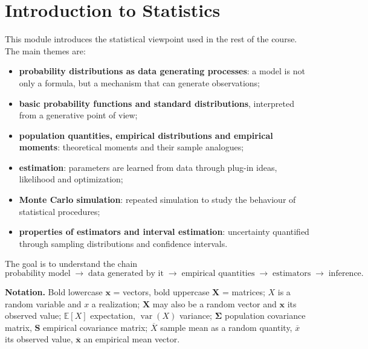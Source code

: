 
\providecommand{\PP}{\mathbb{P}}
\providecommand{\EE}{\mathbb{E}}
\providecommand{\Var}{\operatorname{var}}
\providecommand{\Cov}{\operatorname{cov}}
\providecommand{\Cor}{\operatorname{cor}}
\providecommand{\iid}{\overset{\text{i.i.d.}}{\sim}}

\chapter{Introduction to Statistics}

This module introduces the statistical viewpoint used in the rest of the course. The main themes are:
\begin{itemize}
  \item \textbf{probability distributions as data generating processes}: a model is not only a formula, but a mechanism
        that can generate observations;
  \item \textbf{basic probability functions and standard distributions}, interpreted from a generative point of view;
  \item \textbf{population quantities, empirical distributions and empirical moments}: theoretical moments and their sample analogues;
  \item \textbf{estimation}: parameters are learned from data through plug-in ideas, likelihood and optimization;
  \item \textbf{Monte Carlo simulation}: repeated simulation to study the behaviour of statistical procedures;
  \item \textbf{properties of estimators and interval estimation}: uncertainty quantified through sampling distributions and
        confidence intervals.
\end{itemize}
The goal is to understand the chain
\[
  \text{probability model} \;\to\; \text{data generated by it} \;\to\; \text{empirical quantities} \;\to\; \text{estimators}
  \;\to\; \text{inference}.
\]

\textbf{Notation.} Bold lowercase $\mathbf{x}$ = vectors, bold uppercase $\mathbf{X}$ = matrices; $X$ is a random variable and $x$ a
realization; $\mathbf{X}$ may also be a random vector and $\mathbf{x}$ its observed value; $\EE[X]$ expectation, $\Var(X)$ variance;
$\boldsymbol{\Sigma}$ population covariance matrix, $\mathbf{S}$ empirical covariance matrix; $\overline{X}$ sample mean as a random
quantity, $\overline{x}$ its observed value, $\overline{\mathbf{x}}$ an empirical mean vector.

